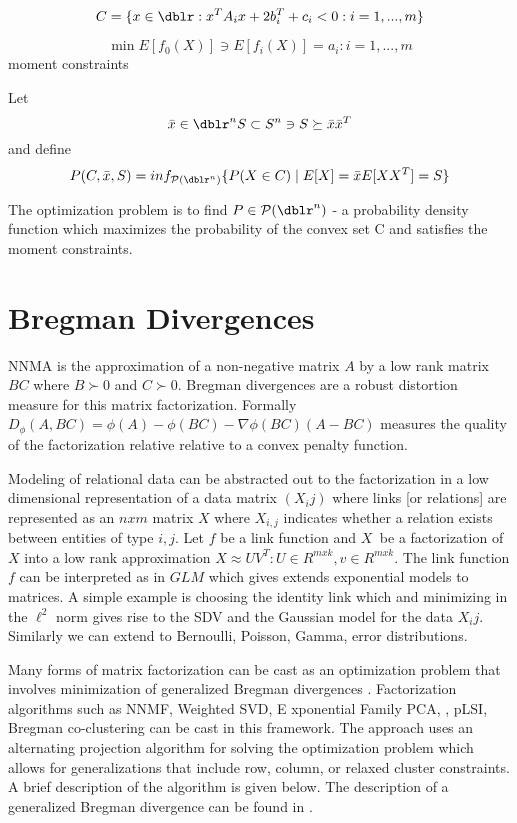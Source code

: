 \begin{equation*}  C = \{ x \in \dblr :  x^T A_i x + 2 b_{i}^{T} +c_i <0 : i=1, ...,m \} \end{equation*}

\begin{equation*}
\min E[f_0(X)] \ni E[f_i(X)] = a_i : i=1, ...,m
\end{equation*}
 moment constraints

Let
\begin{equation*}
 \bar{x} \in \dblr^n S \subset S^n \ni S \succeq \bar{x} \bar{x}^T
\end{equation*}
  and define
 \begin{equation*}
 P(C,\bar{x},S) = inf_{\mathcal{P}(\dblr^n)} \{P(X \in C) \mid E[X] = \bar{x} E[X X^T] = S \}
 \end{equation*}

The optimization problem is to find $ P \in \mathcal{P}(\dblr^n) $ - a probability density function which maximizes the probability of the convex set C and satisfies the moment constraints.



\section*{Bregman Divergences}
NNMA is the approximation of a non-negative matrix $A$ by a low rank matrix $BC$ where $B\succ 0$ and $C\succ 0$.  Bregman divergences are a robust distortion measure for this matrix factorization.  Formally $D_\phi(A,BC)=\phi(A)-\phi(BC) - \nabla\phi(BC) (A-BC)$ measures the quality of the factorization relative relative to a convex penalty function.

Modeling of relational data can be abstracted out to the factorization in a low dimensional representation of a data matrix $(X_ij)$ where links [or relations] are represented as an $n x m$ matrix $X$ where $X_{i,j}$ indicates whether a relation exists between entities of type $i, j$.  Let $f$ be a link function and $X^{~}$ be a factorization of $X$ into a low rank approximation $X \approx U V^T : U \in R^{m x k}, v \in R^{m x k}$.  The link function $f$ can be interpreted as in $GLM$ which gives extends exponential models to matrices.  A simple example is choosing the identity link which and minimizing in the $\ell^2$ norm gives rise to the SDV and the Gaussian model for the data ${X_ij}$.  Similarly we can  extend to Bernoulli, Poisson, Gamma, error distributions.

Many forms of matrix factorization can be cast as an optimization problem that involves minimization of generalized Bregman divergences \cite{BDAUnifiedViewMatrixFactorizationModels}.  Factorization algorithms such as  NNMF, Weighted SVD, E xponential Family PCA, , pLSI, Bregman co-clustering \cite{CCBanerjee04ageneralized} can be cast in this framework. The approach uses an alternating projection algorithm for solving the optimization problem which allows for generalizations that include row, column, or relaxed cluster  constraints.  A brief description of the algorithm is given below.  The description of a generalized Bregman divergence can be found in \cite{BDGordon99approximatesolutions}.

